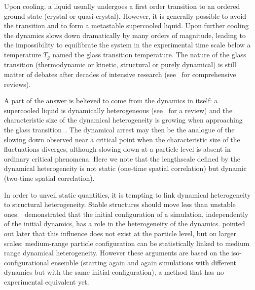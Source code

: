 
Upon cooling, a liquid usually undergoes a first order transition to an ordered ground state (crystal or quasi-crystal). However, it is generally possible to avoid the transition and to form a metastable supercooled liquid. Upon further cooling the dynamics slows down dramatically by many orders of magnitude, leading to the impossibility to equilibrate the system in the experimental time scale below a temperature $T_g$ named the glass transition temperature. The nature of the glass transition (thermodynamic or kinetic, structural or purely dynamical) is still matter of debates after decades of intensive research (see~\citep{cavagna2009supercooled,BerthierR} for comprehensive reviews).

A part of the answer is believed to come from the dynamics in itself: a supercooled liquid is dynamically heterogeneous (see~\citep{BerthierR} for a review) and the characteristic size of the dynamical heterogeneity is growing when approaching the glass transition~\citep{yamamoto1998, Donati1999a}. The dynamical arrest may then be the analogue of the slowing down observed near a critical point when the characteristic size of the fluctuations diverges, although slowing down at a particle level is absent in ordinary critical phenomena. Here we note that the lengthscale defined by the dynamical heterogeneity is not static (one-time spatial correlation) but dynamic (two-time spatial correlation). 

In order to unveil static quantities, it is tempting to link dynamical heterogeneity to structural heterogeneity. Stable structures should move less than unstable ones.~\citet{Widmer-Cooper2005} demonstrated that the initial configuration of a simulation, independently of the initial dynamics, has a role in the heterogeneity of the dynamics. \citet{Berthier2007} pointed out later that this influence does not exist at the particle level, but on larger scales: medium-range particle configuration can be statistically linked to medium range dynamical heterogeneity. However these arguments are based on the iso-configurational ensemble (starting again and again simulations with different dynamics but with the same initial configuration), a method that has no experimental equivalent yet.

